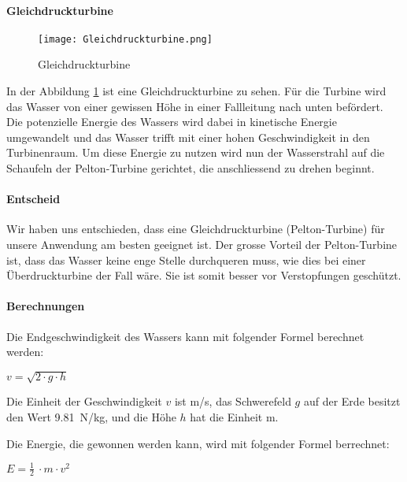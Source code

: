 \paragraph{Gleichdruckturbine}
\begin{figure} [H]
	\centering
	\texttt{[image: Gleichdruckturbine.png]}
	\caption{Gleichdruckturbine \cite{wiki_gleichdruckturbine}}
	\label{fig:Gleichdruckturbine}
\end{figure}

In der Abbildung \ref{fig:Gleichdruckturbine}  ist eine Gleichdruckturbine zu sehen. Für die Turbine wird das Wasser von einer gewissen Höhe in einer Fallleitung nach unten befördert. Die potenzielle Energie des Wassers wird dabei in kinetische Energie umgewandelt und das Wasser trifft mit einer hohen Geschwindigkeit in den Turbinenraum. Um diese Energie zu nutzen wird nun der Wasserstrahl auf die Schaufeln der Pelton-Turbine gerichtet, die anschliessend zu drehen beginnt. 


\newpage

\paragraph{Entscheid}

Wir haben uns entschieden, dass eine Gleichdruckturbine (Pelton-Turbine) für unsere Anwendung am besten geeignet ist. Der grosse Vorteil der Pelton-Turbine ist, dass das Wasser keine enge Stelle durchqueren muss, wie dies bei einer Überdruckturbine der Fall wäre. Sie ist somit besser vor Verstopfungen geschützt.

\paragraph{Berechnungen}
Die Endgeschwindigkeit des Wassers kann mit folgender Formel berechnet werden:
\begin{center}
\(v = \sqrt{2 \cdot g \cdot h} \)
\end{center}

Die Einheit der Geschwindigkeit \(v\) ist \si{m/s}, das Schwerefeld \(g\) auf der Erde besitzt den Wert 9.81~\si{N/kg}, und die Höhe \(h\) hat die Einheit \si{m}.

\bigskip

Die Energie, die gewonnen werden kann, wird mit folgender Formel berrechnet:

\begin{center}
\(E =\frac 12\ \cdot m \cdot v^2\)
\end{center}

